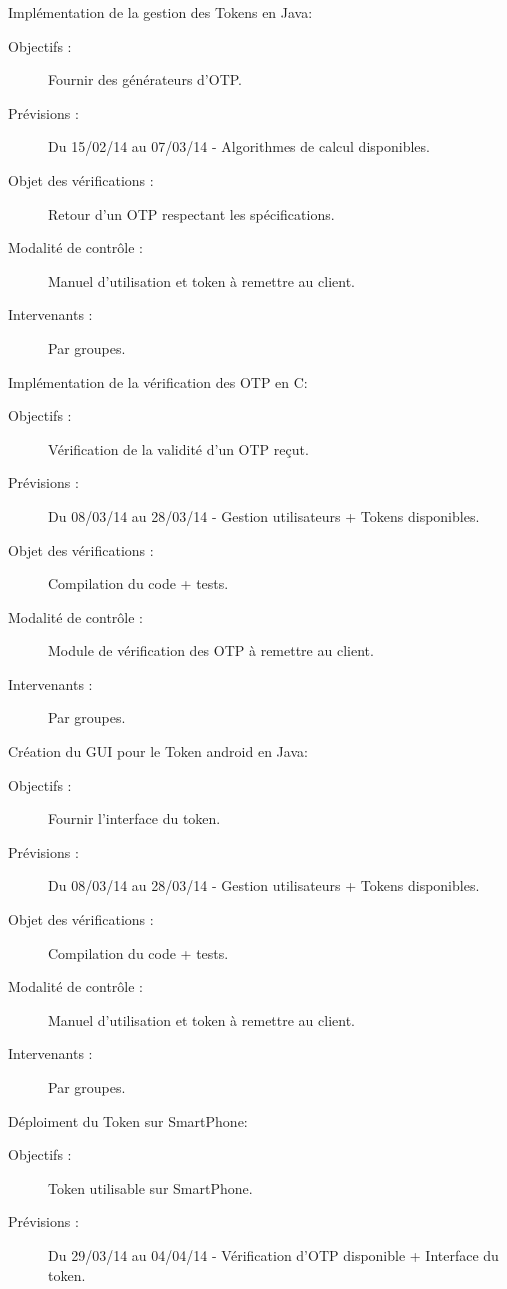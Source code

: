 \documentclass{../../res/univ-projet}
\begin{document}
\begin{description}
\begin{description}
	\end{description}
	\vfill
	\item Implémentation de la gestion des Tokens en Java:
	\begin{description}
		\item[Objectifs :] Fournir des générateurs d'OTP.
		\item[Prévisions :] Du 15/02/14 au 07/03/14 - Algorithmes de calcul disponibles.
		\item[Objet des vérifications :] Retour d'un OTP respectant les spécifications.
		\item[Modalité de contrôle :] Manuel d'utilisation et token à remettre au client.
		\item[Intervenants :] Par groupes.
	\end{description}
	\vfill
	\item Implémentation de la vérification des OTP en C:
	\begin{description}
		\item[Objectifs :] Vérification de la validité d'un OTP reçut.
		\item[Prévisions :] Du 08/03/14 au 28/03/14 - Gestion utilisateurs + Tokens disponibles.
		\item[Objet des vérifications :] Compilation du code + tests.
		\item[Modalité de contrôle :] Module de vérification des OTP à remettre au client.
		\item[Intervenants :] Par groupes.
	\end{description}
	\vfill
	\item Création du GUI pour le Token android en Java:
	\begin{description}
		\item[Objectifs :] Fournir l'interface du token.
		\item[Prévisions :] Du 08/03/14 au 28/03/14 - Gestion utilisateurs + Tokens disponibles.
		\item[Objet des vérifications :] Compilation du code + tests.
		\item[Modalité de contrôle :] Manuel d'utilisation et token à remettre au client.
		\item[Intervenants :] Par groupes.
	\end{description}
	\vfill
	\item Déploiment du Token sur SmartPhone:
	\begin{description}
		\item[Objectifs :] Token utilisable sur SmartPhone.
		\item[Prévisions :] Du 29/03/14 au 04/04/14 - Vérification d'OTP disponible + Interface du token.

\end{description}
\end{description}
\end{document}
